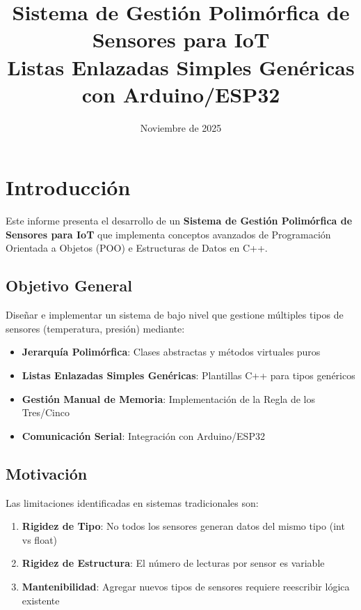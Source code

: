 \documentclass[12pt, spanish]{article}
\title{
    \textbf{Sistema de Gestión Polimórfica de Sensores para IoT} \\
    \vspace{1cm}
    \Large{Listas Enlazadas Simples Genéricas con Arduino/ESP32}
}
\author{}
\date{Noviembre de 2025}
\begin{document}
\maketitle

\newpage
\tableofcontents
\newpage

\section{Introducción}

Este informe presenta el desarrollo de un \textbf{Sistema de Gestión Polimórfica de Sensores para IoT} que implementa conceptos avanzados de Programación Orientada a Objetos (POO) e Estructuras de Datos en C++.

\subsection{Objetivo General}

Diseñar e implementar un sistema de bajo nivel que gestione múltiples tipos de sensores (temperatura, presión) mediante:
\begin{itemize}
    \item \textbf{Jerarquía Polimórfica}: Clases abstractas y métodos virtuales puros
    \item \textbf{Listas Enlazadas Simples Genéricas}: Plantillas C++ para tipos genéricos
    \item \textbf{Gestión Manual de Memoria}: Implementación de la Regla de los Tres/Cinco
    \item \textbf{Comunicación Serial}: Integración con Arduino/ESP32
\end{itemize}

\subsection{Motivación}

Las limitaciones identificadas en sistemas tradicionales son:
\begin{enumerate}
    \item \textbf{Rigidez de Tipo}: No todos los sensores generan datos del mismo tipo (int vs float)
    \item \textbf{Rigidez de Estructura}: El número de lecturas por sensor es variable
    \item \textbf{Mantenibilidad}: Agregar nuevos tipos de sensores requiere reescribir lógica existente
\end{enumerate}
\end{document}
